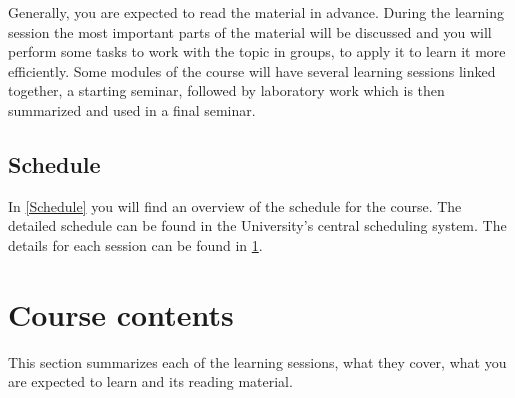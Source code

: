 Generally, you are expected to read the material in advance.
During the learning session the most important parts of the material will be 
discussed and you will perform some tasks to work with the topic in groups, 
\ie to apply it to learn it more efficiently.
Some modules of the course will have several learning sessions linked together,
\eg a starting seminar, followed by laboratory work which is then summarized 
and used in a final seminar.

\subsection{Schedule}

In \cref{Schedule} you will find an overview of the schedule for the course.
The detailed schedule can be found in the University's central scheduling 
system.
The details for each session can be found in \cref{CourseContents}.

\begin{frame}[allowframebreaks]

\end{frame}


\section{Course contents}%
\label{CourseContents}

This section summarizes each of the learning sessions, \ie what they cover, 
what you are expected to learn and its reading material.

%
%

